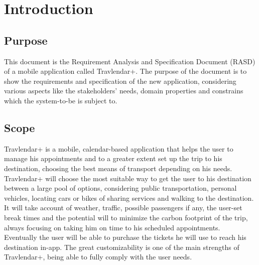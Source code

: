 %
%
\chapter{Introduction}
%
\label{cap:introduction}
%
%
\section{Purpose}
This document is the Requirement Analysis and Specification Document (RASD) of a mobile application called Travlendar+. The purpose of the document is to show the requirements and specification of the new application, considering various aspects like the stakeholders' needs, domain properties and constrains which the system-to-be is subject to.
%
%
\section{Scope}
Travlendar+ is a mobile, calendar-based application that helps the user to manage his appointments and to a greater extent set up the trip to his destination, choosing the best means of transport depending on his needs. \\
Travlendar+ will choose the most suitable way to get the user to his destination between a large pool of options, considering public transportation, personal vehicles, locating cars or bikes of sharing services and walking to the destination. It will take account of weather, traffic, possible passengers if any, the user-set break times and the potential will to minimize the carbon footprint of the trip, always focusing on taking him on time to his scheduled appointments. \\
Eventually the user will be able to purchase the tickets he will use to reach his destination in-app. The great customizability is one of the main strengths of Travlendar+, being able to fully comply with the user needs. 
%
%
